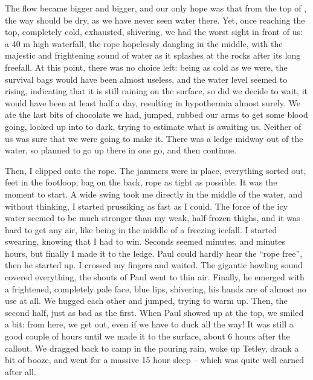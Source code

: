 The flow became bigger and bigger, and our only hope was that from the
top of , the way should be dry, as we have never seen water
there. Yet, once reaching the top, completely cold, exhausted,
shivering, we had the worst sight in front of us: a 40 m high waterfall,
the rope hopelessly dangling in the middle, with the majestic and
frightening sound of water as it splashes at the rocks after its long
freefall. At this point, there was no choice left: being as cold as we
were, the survival bags would have been almost useless, and the water
level seemed to rising, indicating that it is still raining on the
surface, so did we decide to wait, it would have been at least half a
day, resulting in hypothermia almost surely. We ate the last bits of
chocolate we had, jumped, rubbed our arms to get some blood going,
looked up into to dark, trying to estimate what is awaiting us. Neither
of us was sure that we were going to make it. There was a ledge midway
out of the water, so planned to go up there in one go, and then continue.


Then, I clipped onto the rope. The jammers were in place, everything
sorted out, feet in the footloop, bag on the back, rope as tight as
possible. It was the moment to start. A wide swing took me directly in
the middle of the water, and without thinking, I started prussiking as
fast as I could. The force of the icy water seemed to be much stronger
than my weak, half-frozen thighs, and it was hard to get any air, like
being in the middle of a freezing icefall. I started swearing, knowing
that I had to win. Seconds seemed minutes, and minutes hours, but
finally I made it to the ledge. Paul could hardly hear the ``rope
free'', then he started up. I crossed my fingers and waited. The
gigantic howling sound covered everything, the shouts of Paul went to
thin air.  Finally, he emerged with a frightened, completely pale face,
blue lips, shivering, his hands are of almost no use at all. We hugged
each other and jumped, trying to warm up. Then, the second half, just as
bad as the first. When Paul showed up at the top, we smiled a bit: from
here, we get out, even if we have to duck all the way! It was still a
good couple of hours until we made it to the surface, about 6 hours
after the callout. We dragged back to camp in the pouring rain, woke up
Tetley, drank a bit of booze, and went for a massive 15 hour sleep --
which was quite well earned after all.

